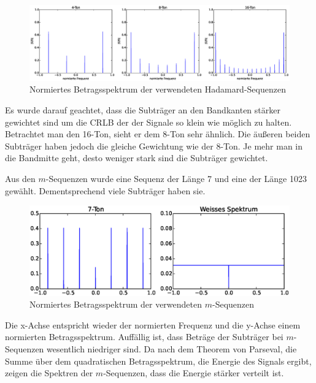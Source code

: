 \begin{figure}[htbp]
	\centering
	\includegraphics[width = \textwidth]{images/HadamardBeispiel}
	\caption{Normiertes Betragsspektrum der verwendeten Hadamard-Sequenzen}
	\label{fig:HadamardBeispiel}
\end{figure}
Es wurde darauf geachtet, dass die Subträger an den Bandkanten stärker gewichtet sind um die \gls{CRLB} der der Signale so klein wie möglich zu halten. Betrachtet man den 16-Ton, sieht er dem 8-Ton sehr ähnlich. Die äußeren beiden Subträger haben jedoch die gleiche Gewichtung wie der 8-Ton. Je mehr man in die Bandmitte geht, desto weniger stark sind die Subträger gewichtet.

Aus den $m$-Sequenzen wurde eine Sequenz der Länge 7 und eine der Länge 1023 gewählt. Dementsprechend viele Subträger haben sie.  
\begin{figure}[htbp]
	\centering
	\includegraphics[width = \textwidth]{images/mSeqBeispiel}
	\caption{Normiertes Betragsspektrum der verwendeten $m$-Sequenzen}
	\label{fig:mSeqBeispiel}
\end{figure}
Die x-Achse entspricht wieder der normierten Frequenz und die y-Achse einem normierten Betragsspektrum. Auffällig ist, dass Beträge der Subträger bei $m$-Sequenzen wesentlich niedriger sind. Da nach dem Theorem von Parseval, die Summe über dem quadratischen Betragsspektrum, die Energie des Signals ergibt, zeigen die Spektren der $m$-Sequenzen, dass die Energie stärker verteilt ist.

